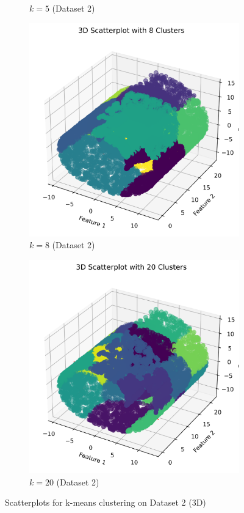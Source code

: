 \documentclass{article}
\begin{document}
\begin{figure}[h]
\begin{subfigure}[b]{0.45\textwidth}
        \caption{$k=5$ (Dataset 2)}
        \label{fig:3d_k5}
    \end{subfigure}
    \begin{subfigure}[b]{0.45\textwidth}
        \includegraphics[width=\textwidth]{figures/3d_scatter_k8_d1.png}
        \caption{$k=8$ (Dataset 2)}
        \label{fig:3d_k8}
    \end{subfigure}
    \begin{subfigure}[b]{0.45\textwidth}
        \includegraphics[width=\textwidth]{figures/3d_scatter_k20_d1.png}
        \caption{$k=20$ (Dataset 2)}
        \label{fig:3d_k20}
    \end{subfigure}
    \caption{Scatterplots for k-means clustering on Dataset 2 (3D)}
    \label{fig:3d_scatterplots}
\end{figure}
\end{document}
